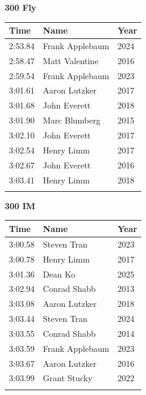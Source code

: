 \vspace{1.2em}
\noindent\begin{minipage}[t]{0.48\textwidth}
\centering
\textbf{\textcolor{teamprimary}{300 Fly}}\par
\vspace{0.5em}
\centering
\small
\renewcommand{\arraystretch}{1.0}
\setlength{\tabcolsep}{4pt}
\begin{tabular}{@{}p{1.8cm}p{3.0cm}p{1.0cm}@{}}
\toprule
\textbf{Time} & \textbf{Name} & \textbf{Year} \\
\midrule
2:53.84 & Frank Applebaum & 2024 \\
2:58.47 & Matt Valentine & 2016 \\
2:59.54 & Frank Applebaum & 2023 \\
3:01.61 & Aaron Lutzker & 2017 \\
3:01.68 & John Everett & 2018 \\
3:01.90 & Marc Blumberg & 2015 \\
3:02.10 & John Everett & 2017 \\
3:02.54 & Henry Limm & 2017 \\
3:02.67 & John Everett & 2016 \\
3:03.41 & Henry Limm & 2018 \\
\bottomrule
\vspace{0.5em}
\end{tabular}
\end{minipage}
\hfill
\begin{minipage}[t]{0.48\textwidth}
\centering
\textbf{\textcolor{teamprimary}{300 IM}}\par
\vspace{0.5em}
\centering
\small
\renewcommand{\arraystretch}{1.0}
\setlength{\tabcolsep}{4pt}
\begin{tabular}{@{}p{1.8cm}p{3.0cm}p{1.0cm}@{}}
\toprule
\textbf{Time} & \textbf{Name} & \textbf{Year} \\
\midrule
3:00.58 & Steven Tran & 2023 \\
3:00.78 & Henry Limm & 2017 \\
3:01.36 & Dean Ko & 2025 \\
3:02.94 & Conrad Shabb & 2013 \\
3:03.08 & Aaron Lutzker & 2018 \\
3:03.44 & Steven Tran & 2024 \\
3:03.55 & Conrad Shabb & 2014 \\
3:03.59 & Frank Applebaum & 2023 \\
3:03.67 & Aaron Lutzker & 2016 \\
3:03.99 & Grant Stucky & 2022 \\
\bottomrule
\vspace{0.5em}
\end{tabular}
\end{minipage}
